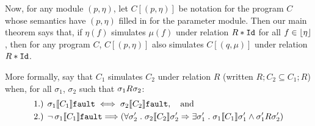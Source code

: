 Now, for any module $(p,\eta)$, let $C[(p,\eta)]$ be notation for the program $C$ whose semantics have $(p,\eta)$ filled
in for the parameter module. Then our main theorem says that, if $\eta(f)$ simulates $\mu(f)$ under relation $R*\id$ for all $f \in \dom{\eta}$, 
then for any program $C$, $C[(p,\eta)]$ also simulates $C[(q,\mu)]$ under relation $R*\id$.
\begin{comment} 
\ifextended
We will now give a formal definition of a simulation. First, if $C_1$ simulates $C_2$ under relation $R$, then for any initial states
$\sigma_1$ and $\sigma_2$ related by $R$ and any execution of $C_2$ from $\sigma_2$ terminating at $\sigma_2'$, there must exist a $\sigma_1'$
related by $R$ to $\sigma_2'$ such that $C_1$ can terminate at $\sigma_1'$ when executed from $\sigma_1$. Secondly, if $C_2$ can fault
(either with $\fault$ or $\av$) when executed on $\sigma_2$, then $C_1$ must also be able to fault. This second property can be enforced
simply by extending the relation $R$ to $R^\bot$ of type $(\Sigma \uplus \{\fault,\av\},\Sigma \uplus \{\fault,\av\})$, which relates
each fault to both faults (and acts like $R$ otherwise). In fact, we will take the same approach as is done in~\cite{filipovic10}, and
extend $R^\bot$ even further to relate each fault to both fault \emph{and all states}. Intuitively, this is reasonable to do because if
we were actually using this system in practice, we would have a program logic that would guarantee that the abstract module execution
cannot fault. Hence any execution of $C_1$ on $\sigma_1$ that faults is not actually possible. A more detailed argument is given 
in~\cite{filipovic10} (they refer to these relation extensions as ``trumping relations'').

Thus we say that $C_1$ simulates $C_2$ under relation $R$
(written $R;C_2 \subseteq C_1;R$) when, for all $\sigma_1$, $\sigma_2$ such that $\relate{R}{\sigma_1}{\sigma_2}$:
\begin{align*}
\forall \rho_2 \such \relate{\den{C_2}}{\sigma_2}{\rho_2} \Rightarrow
\exists \rho_1 \such \relate{\den{C_1}}{\sigma_1}{\rho_1} \land \relate{R^\bot}{\rho_1}{\rho_2}) 
\end{align*}
\else
\end{comment}
More formally, say that $C_1$ simulates $C_2$ under relation $R$
(written $R;C_2 \subseteq C_1;R$) when, for all $\sigma_1$, $\sigma_2$ such that $\relate{R}{\sigma_1}{\sigma_2}$:
\begin{align*}
& \text{1.) } \relate{\den{C_1}}{\sigma_1}{\fault} \iff \relate{\den{C_2}}{\sigma_2}{\fault}, \quad \text{and}  \\
& \text{2.) } \lnot \, \relate{\den{C_1}}{\sigma_1}{\fault} \Longrightarrow (\forall \sigma_2' \such \relate{\den{C_2}}{\sigma_2}{\sigma_2'} \Rightarrow
\exists \sigma_1' \such \relate{\den{C_1}}{\sigma_1}{\sigma_1'} \land \relate{R}{\sigma_1'}{\sigma_2'}) \\
\end{align*}

